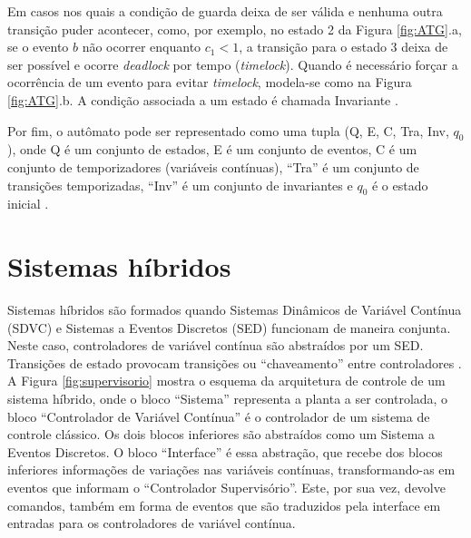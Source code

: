 Em casos nos quais a condição de guarda deixa de ser válida e nenhuma outra transição 
puder acontecer, como, por exemplo, no estado 2 da Figura \ref{fig:ATG}.a, se o evento $b$
não ocorrer enquanto $c_1 < 1$, a transição para o estado 3 deixa de ser possível e ocorre 
\textit{deadlock} por tempo (\textit{timelock}). Quando é necessário forçar a ocorrência de 
um evento para evitar \textit{timelock}, modela-se como na Figura \ref{fig:ATG}.b. A 
condição associada a um estado é chamada Invariante \cite{book:SED}.


Por fim, o autômato pode ser representado como uma tupla (Q, E, C, Tra, Inv,
$q_0$), onde Q é um conjunto de estados, E é um conjunto de eventos, C é um
conjunto de temporizadores (variáveis contínuas), ``Tra'' é um conjunto de
transições temporizadas, ``Inv'' é um conjunto de invariantes e $q_0$ é o
estado inicial \cite{book:SED}.

\section{Sistemas híbridos \label{SEC:SISTEMASHIBRIDOS}}

Sistemas híbridos são formados quando Sistemas Dinâmicos de Variável
Contínua (SDVC) e Sistemas a Eventos Discretos (SED) funcionam de maneira
conjunta. Neste caso, controladores de variável contínua são abstraídos
por um SED. Transições de estado provocam transições ou ``chaveamento'' entre
controladores \cite{book:SED}. A Figura \ref{fig:supervisorio} mostra o esquema
da arquitetura de controle de um sistema híbrido, onde o bloco ``Sistema'' representa
a planta a ser controlada, o bloco ``Controlador de Variável Contínua'' é o controlador
de um sistema de controle clássico. Os dois blocos inferiores são abstraídos como um
Sistema a Eventos Discretos. O bloco ``Interface'' é essa abstração, que recebe
dos blocos inferiores informações de variações nas variáveis contínuas, transformando-as
em eventos que informam o ``Controlador Supervisório''. Este, por sua vez, devolve comandos,
também em forma de eventos que são traduzidos pela interface em entradas para os controladores
de variável contínua.  

